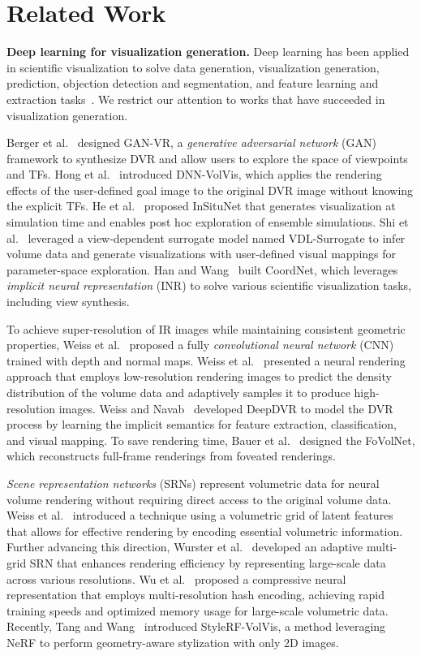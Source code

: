 \section{Related Work}
{\bf Deep learning for visualization generation.} 
Deep learning has been applied in scientific visualization to solve data generation, visualization generation, prediction, objection detection and segmentation, and feature learning and extraction tasks~\cite{Wang-TVCG}.
We restrict our attention to works that have succeeded in visualization generation.

Berger et al.\ \cite{Berger-TFGAN-TVCG19} designed GAN-VR, a {\em generative adversarial network} (GAN) framework to synthesize DVR and allow users to explore the space of viewpoints and TFs.
Hong et al.\ \cite{Hong-DNN-VolVis-PVIS19} introduced DNN-VolVis, which applies the rendering effects of the user-defined goal image to the original DVR image without knowing the explicit TFs. 
He et al.\ \cite{He-InSituNet-TVCG20} proposed InSituNet that generates visualization at simulation time and enables post hoc exploration of ensemble simulations.
Shi et al.\ \cite{Shi-VDL-TVCG22} leveraged a view-dependent surrogate model named VDL-Surrogate to infer volume data and generate visualizations with user-defined visual mappings for parameter-space exploration.
Han and Wang~\cite{Han-CoordNet-TVCG} built CoordNet, which leverages {\em implicit neural representation} (INR) to solve various scientific visualization tasks, including view synthesis.

To achieve super-resolution of IR images while maintaining consistent geometric properties, Weiss et al.\ \cite{Weiss-SRNet-TVCG21} proposed a fully {\em convolutional neural network} (CNN) trained with depth and normal maps.
Weiss et al.\ \cite{Weiss-LearningAdaptive-TVCG22} presented a neural rendering approach that employs low-resolution rendering images to predict the density distribution of the volume data and adaptively samples it to produce high-resolution images.
Weiss and Navab~\cite{Weiss-DeepDVR-ArXiv21} developed DeepDVR to model the DVR process by learning the implicit semantics for feature extraction, classification, and visual mapping. 
To save rendering time, Bauer et al.\ \cite{Bauer-FoVolNet-TVCG23} designed the FoVolNet, which reconstructs full-frame renderings from foveated renderings.

{\em Scene representation networks} (SRNs) represent volumetric data for neural volume rendering without requiring direct access to the original volume data. 
Weiss et al.\ \cite{Weiss-CGF22} introduced a technique using a volumetric grid of latent features that allows for effective rendering by encoding essential volumetric information.
Further advancing this direction, Wurster et al.\ \cite{Wurster-TVCG24} developed an adaptive multi-grid SRN that enhances rendering efficiency by representing large-scale data across various resolutions. 
Wu et al.\ \cite{Wu-TVCG24} proposed a compressive neural representation that employs multi-resolution hash encoding, achieving rapid training speeds and optimized memory usage for large-scale volumetric data.
Recently, Tang and Wang~\cite{Tang-VIS24} introduced StyleRF-VolVis, a method leveraging NeRF to perform geometry-aware stylization with only 2D images.

